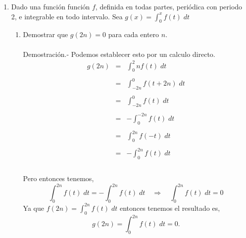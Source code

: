 \begin{enumerate}[\bfseries  1.]
\begin{enumerate}[\bfseries (a)]
	\end{enumerate}


    \item Dado una función función $f$, definida en todas partes, periódica con periodo 2, e integrable en todo intervalo. Sea $g(x)=\int_0^x f(t)\; dt$ 
	\begin{enumerate}[\bfseries (a)]

	    \item Demostrar que $g(2n)=0$ para cada entero $n$.\\\\
		Demostración.-\; Podemos establecer esto por un calculo directo.
		$$\begin{array}{rcl}
		    g(2n)&=&\displaystyle\int_0^2n f(t)\; dt\\\\
			 &=&\displaystyle\int_{-2n}^0 f(t+2n)\; dt\\\\
			 &=&\displaystyle\int_{-2n}^0 f(t)\; dt\\\\
			 &=&-\displaystyle\int_0^{-2n} f(t)\; dt\\\\
			 &=&\displaystyle\int_0^{2n} f(-t)\; dt\\\\
			 &=&-\displaystyle\int_0^{2n} f(t)\; dt\\\\
		\end{array}$$

		Pero entonces tenemos, 
		$$\int_0^{2n} f(t)\; dt = -\int_0^{2n} f(t)\; dt \quad \Longrightarrow \quad \int_0^{2n} f(t)\; dt=0$$
		Ya que $f(2n)=\int_0^{2n} f(t)\; dt$ entonces tenemos el resultado es,
		$$g(2n)=\int_0^{2n} f(t)\; dt=0.$$\\


\end{enumerate}
\end{enumerate}
